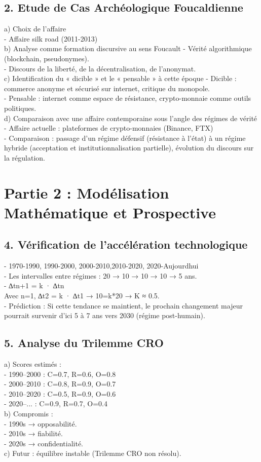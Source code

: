 \documentclass[french]{article}
\begin{document}
\subsection*{2.	Etude de Cas Archéologique Foucaldienne}
a)	Choix de l’affaire\\
-	Affaire silk road (2011-2013)\\
b)	Analyse comme formation discursive au sens Foucault
-	Vérité algorithmique (blockchain, pseudonymes).\\
-	Discours de la liberté, de la décentralisation, de l’anonymat.\\
c)	Identification du « dicible » et le « pensable » à cette époque
-	Dicible : commerce anonyme et sécurisé sur internet, critique du monopole.\\
-	Pensable : internet comme espace de résistance, crypto-monnaie comme outils politiques.\\
d)	Comparaison avec une affaire contemporaine sous l’angle des régimes de vérité
-	Affaire actuelle : plateformes de crypto-monnaies (Binance, FTX)\\
-	Comparaison : passage d’un régime défensif (résistance à l’état) à un régime hybride (acceptation et institutionnalisation partielle), évolution du discours sur la régulation.\\

\section{Partie 2 : Modélisation Mathématique et Prospective}
\subsection*{4.	Vérification de l’accélération technologique}
-	1970-1990, 1990-2000, 2000-2010,2010-2020, 2020-Aujourdhui\\
-	Les intervalles entre régimes : 20 → 10 → 10 → 10 → 5 ans.\\
-	∆tn+1 = k · ∆tn \\
Avec n=1, ∆t2 = k · ∆t1 → 10=k*20 → K ≈ 0.5.\\
-	Prédiction : Si cette tendance se maintient, le prochain changement majeur pourrait survenir d'ici 5 à 7 ans vers 2030 (régime post-humain).\\
\subsection*{5.	Analyse du Trilemme CRO}
a)	Scores estimés :\\
-	1990–2000 : C=0.7, R=0.6, O=0.8\\
-	2000–2010 : C=0.8, R=0.9, O=0.7\\
-	2010–2020 : C=0.5, R=0.9, O=0.6\\
-	2020–... : C=0.9, R=0.7, O=0.4\\
b)	Compromis :\\
-	1990s → opposabilité.\\
-	2010s → fiabilité.\\
-	2020s → confidentialité.\\
c)	Futur : équilibre instable (Trilemme CRO non résolu).
\end{document}
